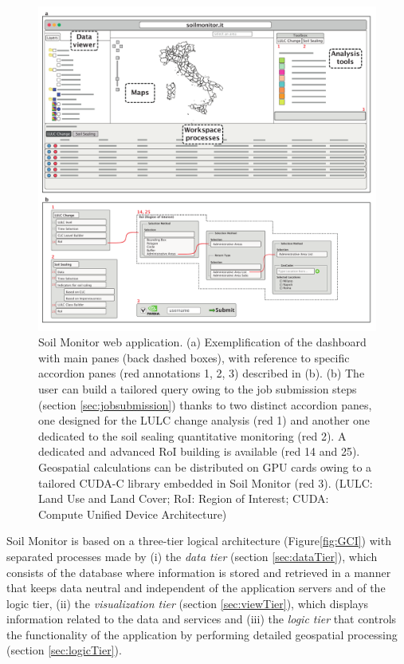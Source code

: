 \documentclass[APA,LATO1COL,doublespace]{WileyNJD-v2}
\begin{document}
\begin{figure}[t] %
    \centerline{\includegraphics[width=500pt]{01_piattaforma}}
    \caption{Soil Monitor web application.
             (a) Exemplification of the dashboard with main panes (back dashed boxes), with reference to specific accordion panes (red annotations 1, 2, 3) described in (b). 
             (b) The user can build a tailored query owing to the job submission steps (section \ref{sec:jobsubmission}) thanks to two distinct accordion panes, one designed for the LULC change analysis (red 1) and another one dedicated to the soil sealing quantitative monitoring (red 2). A dedicated and advanced RoI building is available (red 14 and 25). Geospatial calculations can be distributed on GPU cards owing to a tailored CUDA-C library embedded in Soil Monitor (red 3).
             (LULC: Land Use and Land Cover; RoI: Region of Interest; CUDA: Compute Unified Device Architecture)
            } \label{fig:SMapp}
\end{figure}

Soil Monitor is based on a three-tier logical architecture (Figure\ref{fig:GCI}) with separated processes made by 
(i) 
the \textit{data tier} (section \ref{sec:dataTier}), which consists of the database where information is stored and retrieved in a manner that keeps data neutral and independent of the application servers and of the logic tier,
(ii) the \textit{visualization tier} (section \ref{sec:viewTier}), which displays information related to the data and services
and 
(iii) 
the \textit{logic tier} that controls the functionality of the application by performing detailed geospatial processing (section \ref{sec:logicTier}).
\end{document}
